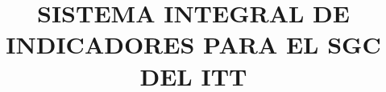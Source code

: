 \documentclass[11pt]{book}
\begin{document}









\title{SISTEMA INTEGRAL DE INDICADORES PARA EL SGC DEL ITT} %
\end{document}
